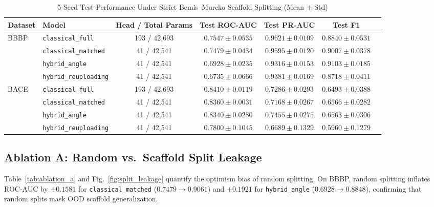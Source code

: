 \documentclass[conference]{IEEEtran}
\begin{document}
\begin{table}[t]
\centering
\caption{5-Seed Test Performance Under Strict Bemis--Murcko Scaffold Splitting (Mean $\pm$ Std)}
\label{tab:main}
\begin{tabular}{@{}llccccc@{}}
\toprule
Dataset & Model & Head / Total Params & Test ROC-AUC & Test PR-AUC & Test F1 \\
\midrule
\multirow{4}{*}{BBBP} & \texttt{classical\_full} & 193 / 42,693 & $0.7547 \pm 0.0535$ & $0.9621 \pm 0.0109$ & $0.8840 \pm 0.0531$ \\
 & \texttt{classical\_matched} & 41 / 42,541 & $0.7479 \pm 0.0434$ & $0.9595 \pm 0.0120$ & $0.9007 \pm 0.0378$ \\
 & \texttt{hybrid\_angle} & 41 / 42,541 & $0.6928 \pm 0.0235$ & $0.9316 \pm 0.0153$ & $\mathbf{0.9103 \pm 0.0185}$ \\
 & \texttt{hybrid\_reuploading} & 41 / 42,541 & $0.6735 \pm 0.0666$ & $0.9381 \pm 0.0169$ & $0.8718 \pm 0.0411$ \\
\midrule
\multirow{4}{*}{BACE} & \texttt{classical\_full} & 193 / 42,693 & $0.8410 \pm 0.0119$ & $0.7286 \pm 0.0293$ & $0.6493 \pm 0.0388$ \\
 & \texttt{classical\_matched} & 41 / 42,541 & $0.8360 \pm 0.0031$ & $0.7168 \pm 0.0267$ & $0.6566 \pm 0.0282$ \\
 & \texttt{hybrid\_angle} & 41 / 42,541 & $0.8340 \pm 0.0280$ & $\mathbf{0.7455 \pm 0.0275}$ & $0.6563 \pm 0.0306$ \\
 & \texttt{hybrid\_reuploading} & 41 / 42,541 & $0.7800 \pm 0.1045$ & $0.6689 \pm 0.1329$ & $0.5960 \pm 0.1279$ \\
\bottomrule
\end{tabular}
\end{table}

\subsection{Ablation A: Random vs.\ Scaffold Split Leakage}
Table~\ref{tab:ablation_a} and Fig.~\ref{fig:split_leakage} quantify the optimism bias of random splitting. On BBBP, random splitting inflates ROC-AUC by $+0.1581$ for \texttt{classical\_matched} ($0.7479 \rightarrow 0.9061$) and $+0.1921$ for \texttt{hybrid\_angle} ($0.6928 \rightarrow 0.8848$), confirming that random splits mask OOD scaffold generalization.
\end{document}
